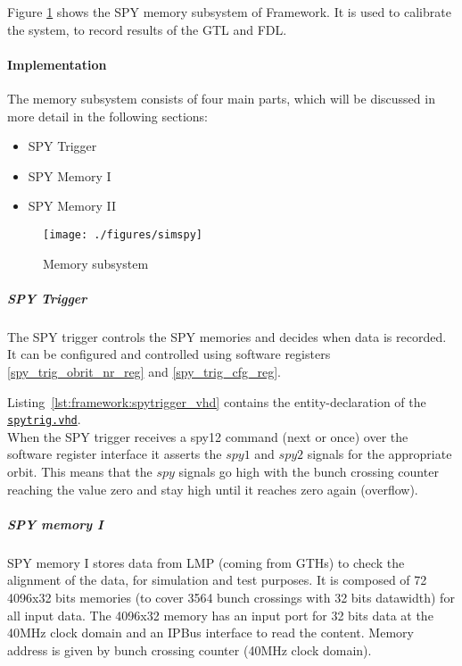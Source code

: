 Figure \ref{fig_simspy} shows the SPY memory subsystem of Framework.
It is used to calibrate the system, to record results of the GTL and FDL.

\paragraph{Implementation}\label{sec:framework:spy_impl}
The memory subsystem consists of four main parts, which will be discussed in more detail in the following sections:

\begin{itemize}
\item SPY Trigger
\item SPY Memory I
\item SPY Memory II
\end{itemize}

\begin{figure}[h]
\texttt{[image: ./figures/simspy]}
\caption{Memory subsystem}
\label{fig_simspy}
\end{figure}

\subparagraph{SPY Trigger}\label{sec:framework:spy_trigger}
The SPY trigger controls the SPY memories and decides when data is recorded. It can be configured and controlled using software registers \ref{spy_trig_obrit_nr_reg} and \ref{spy_trig_cfg_reg}.

Listing~\ref{lst:framework:spytrigger_vhd} contains the entity-declaration of the \href{https://github.com/cms-l1-globaltrigger/mp7_ugt_legacy/blob/master/firmware/hdl/payload/frame/spytrig.vhd}{\texttt{spytrig.vhd}}.\\



When the SPY trigger receives a spy12 command (next or once) over the software register interface it asserts the $spy1$ and $spy2$ signals for the appropriate orbit.
This means that the $spy$ signals go high with the bunch crossing counter reaching the value zero and stay high until it reaches zero again (overflow).

\subparagraph{SPY memory I}
SPY memory I stores data from LMP (coming from GTHs) to check the alignment of the data, for simulation and test purposes. It is composed of 72 4096x32 bits memories (to cover 3564 bunch crossings with 32 bits datawidth) for all input data. The 4096x32 memory has an input port for 32 bits data at the 40MHz clock domain and an IPBus interface to read the content. Memory address is given by bunch crossing counter (40MHz clock domain).

